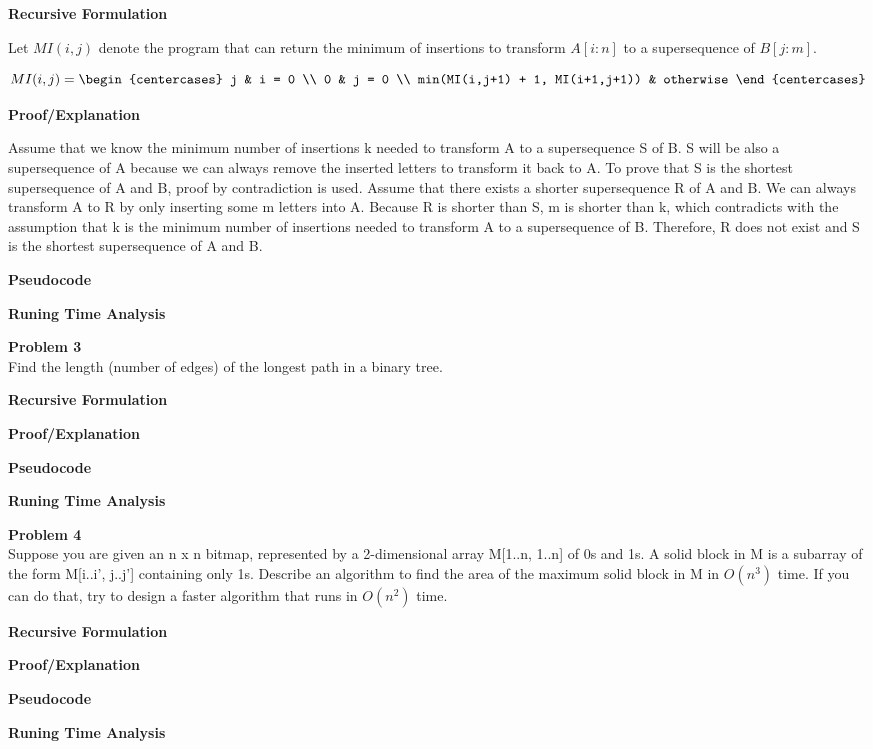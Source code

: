\documentclass[12pt,article]{article}
\newenvironment{problem}[2][Problem]
    { \begin{mdframed}[backgroundcolor=gray!20] \textbf{#1 #2} \\}
    {  \end{mdframed}}
\begin{document}
\textbf{Recursive Formulation}

Let $MI(i,j)$ denote the program that can return the minimum of insertions to transform $A[i:n]$ to a supersequence of $B[j:m]$. 

\normalsize{
    \[
        MI(i,j)=
        \begin{centercases}
            j   & i = 0 \\
            0   & j = 0 \\
            min(MI(i,j+1) + 1, MI(i+1,j+1)) & otherwise
        \end{centercases}
        \]
}

\textbf{Proof/Explanation}

Assume that we know the minimum number of insertions k needed to transform A to a supersequence S of B. S will be also a supersequence of A because we can always remove the inserted letters to transform it back to A. To prove that S is the shortest supersequence of A and B, proof by contradiction is used. Assume that there exists a shorter supersequence R of A and B. We can always transform A to R by only inserting some m letters into A. Because R is shorter than S, m is shorter than k, which contradicts with the assumption that k is the minimum number of insertions needed to transform A to a supersequence of B. Therefore, R does not exist and S is the shortest supersequence of A and B.

\textbf{Pseudocode}

\textbf{Runing Time Analysis}

\newpage
\begin{problem}{3} 
Find the length (number of edges) of the longest path in a binary tree.
\end{problem}

\textbf{Recursive Formulation}

\textbf{Proof/Explanation}

\textbf{Pseudocode}

\textbf{Runing Time Analysis}

\newpage
\begin{problem}{4} 
Suppose you are given an n x n bitmap, represented by a 2-dimensional array M[1..n, 1..n] of 0s and 1s. A solid block in M is a subarray of the form M[i..i', j..j'] containing only 1s. Describe an algorithm to find the area of the maximum solid block in M in $O(n^3)$ time. If you can do that, try to design a faster algorithm that runs in $O(n^2)$ time.
\end{problem}

\textbf{Recursive Formulation}

\textbf{Proof/Explanation}

\textbf{Pseudocode}

\textbf{Runing Time Analysis}



\end{document}
